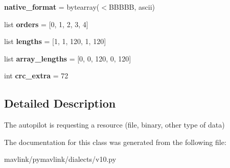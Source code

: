 \begin{DoxyCompactItemize}
\item 
\mbox{\label{classpymavlink_1_1dialects_1_1v10_1_1MAVLink__resource__request__message_ad5f6bdf763814d7b35e26e41ec1c976f}} 
{\bfseries native\+\_\+format} = bytearray(\textquotesingle{}$<$B\+B\+B\+BB\textquotesingle{}, \textquotesingle{}ascii\textquotesingle{})
\item 
\mbox{\label{classpymavlink_1_1dialects_1_1v10_1_1MAVLink__resource__request__message_a8c83dd19db5ce554cb9069f5c448a3fa}} 
list {\bfseries orders} = \mbox{[}0, 1, 2, 3, 4\mbox{]}
\item 
\mbox{\label{classpymavlink_1_1dialects_1_1v10_1_1MAVLink__resource__request__message_a0dbf6def3bf769c1d0ec7f7e86523125}} 
list {\bfseries lengths} = \mbox{[}1, 1, 120, 1, 120\mbox{]}
\item 
\mbox{\label{classpymavlink_1_1dialects_1_1v10_1_1MAVLink__resource__request__message_a3db60b4f6734e94851640c9fe52c01cc}} 
list {\bfseries array\+\_\+lengths} = \mbox{[}0, 0, 120, 0, 120\mbox{]}
\item 
\mbox{\label{classpymavlink_1_1dialects_1_1v10_1_1MAVLink__resource__request__message_a0186bf47b0d5de85de86eb11a317a55a}} 
int {\bfseries crc\+\_\+extra} = 72
\end{DoxyCompactItemize}


\subsection{Detailed Description}
\begin{DoxyVerb}The autopilot is requesting a resource (file, binary, other
type of data)
\end{DoxyVerb}
 

The documentation for this class was generated from the following file\+:\begin{DoxyCompactItemize}
\item 
mavlink/pymavlink/dialects/v10.\+py\end{DoxyCompactItemize}
